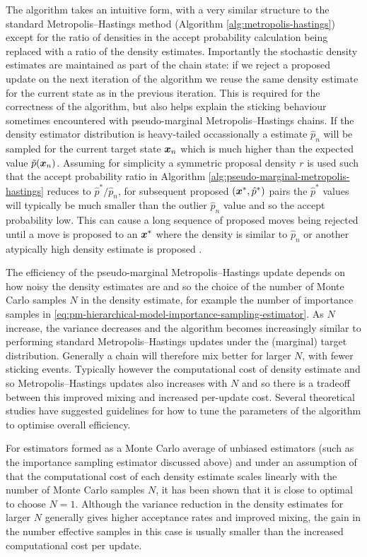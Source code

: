 The algorithm takes an intuitive form, with a very similar structure to the standard Metropolis--Hastings method (Algorithm \ref{alg:metropolis-hastings}) except for the ratio of densities in the accept probability calculation being replaced with a ratio of the density estimates. Importantly the stochastic density estimates are maintained as part of the chain state: if we reject a proposed update on the next iteration of the algorithm we reuse the same density estimate for the current state as in the previous iteration. This is required for the correctness of the algorithm, but also helps explain the sticking behaviour sometimes encountered with pseudo-marginal Metropolis--Hastings chains. If the density estimator distribution is heavy-tailed occassionally a estimate $\hat{p}_n$ will be sampled for the current target state $\boldsymbol{x}_n$ which is much higher than the expected value $\tilde{p}(\boldsymbol{x}_n)$. Assuming for simplicity a symmetric proposal density $r$ is used such that the accept probability ratio in Algorithm \ref{alg:pseudo-marginal-metropolis-hastings} reduces to $\hat{p}^* / \hat{p}_n$, for subsequent proposed $(\boldsymbol{x}^*,\hat{p}^*)$ pairs the $\hat{p}^*$ values will typically be much smaller than the outlier $\hat{p}_n$ value and so the accept probability low. This can cause a long sequence of proposed moves being rejected until a move is proposed to an $\boldsymbol{x}^*$ where the density is similar to $\hat{p}_n$ or another atypically high density estimate is proposed \citep{filippone2014pseudo,andrieu2009pseudo,sherlock2015efficiency}.

The efficiency of the pseudo-marginal Metropolis--Hastings update depends on how noisy the density estimates are and so the choice of the number of Monte Carlo samples $N$ in the density estimate, for example the number of importance samples in \eqref{eq:pm-hierarchical-model-importance-sampling-estimator}. As $N$ increase, the variance decreases and the algorithm becomes increasingly similar to performing standard Metropolis--Hastings updates under the (marginal) target distribution. Generally a chain will therefore mix better for larger $N$, with fewer sticking events. Typically however the computational cost of density estimate and so Metropolis--Hastings updates also increases with $N$ and so there is a tradeoff between this improved mixing and increased per-update cost. Several theoretical studies have suggested guidelines for how to tune the parameters of the algorithm to optimise overall efficiency.

For estimators formed as a Monte Carlo average of unbiased estimators (such as the importance sampling estimator discussed above) and under an assumption of that the computational cost of each density estimate scales linearly with the number of Monte Carlo samples $N$, it has been shown \citep{sherlock2016pseudo,bornn2017use} that it is close to optimal to choose $N = 1$. Although the variance reduction in the density estimates for larger $N$ generally gives higher acceptance rates and improved mixing, the gain in the number effective samples in this case is usually smaller than the increased computational cost per update.

